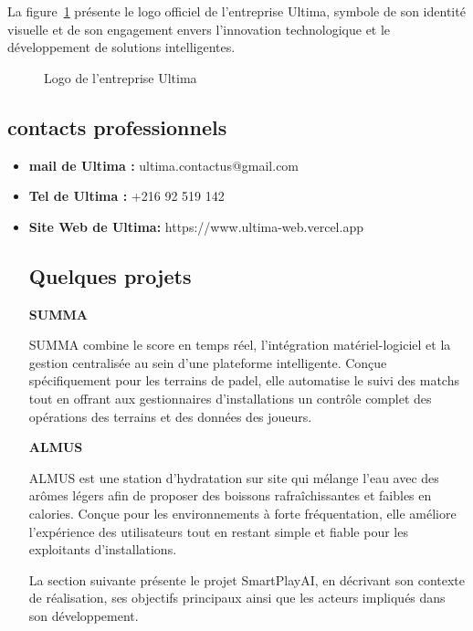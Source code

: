 \begin{justify}
La figure~\ref{fig:logo_ultima} présente le logo officiel de l'entreprise Ultima, symbole
de son identité visuelle et de son engagement envers l'innovation technologique et le
développement de solutions intelligentes.
\end{justify}

\begin{figure}[H]
    \centering
    \caption{Logo de l’entreprise Ultima}
    \label{fig:logo_ultima}
\end{figure}
\subsection{contacts professionnels}
\begin{itemize}
    \item \textbf{mail de Ultima :} ultima.contactus@gmail.com
    \item \textbf{Tel de Ultima :} +216 92 519 142
    \item \textbf{Site Web de Ultima:} https://www.ultima-web.vercel.app

\subsection{Quelques projets}
\textbf{SUMMA}

\vspace{0.3cm}

SUMMA combine le score en temps réel, l'intégration matériel-logiciel et la gestion
centralisée au sein d'une plateforme intelligente. Conçue spécifiquement pour les terrains
de padel, elle automatise le suivi des matchs tout en offrant aux gestionnaires
d'installations un contrôle complet des opérations des terrains et des données des joueurs.

\vspace{0.6cm}

\textbf{ALMUS}

\vspace{0.3cm}

ALMUS est une station d'hydratation sur site qui mélange l'eau avec des arômes légers
afin de proposer des boissons rafraîchissantes et faibles en calories. Conçue pour les
environnements à forte fréquentation, elle améliore l'expérience des utilisateurs tout en
restant simple et fiable pour les exploitants d'installations.

La section suivante présente le projet SmartPlayAI, en décrivant son contexte de réalisation, ses
objectifs principaux ainsi que les acteurs impliqués dans son développement.






\end{itemize}
